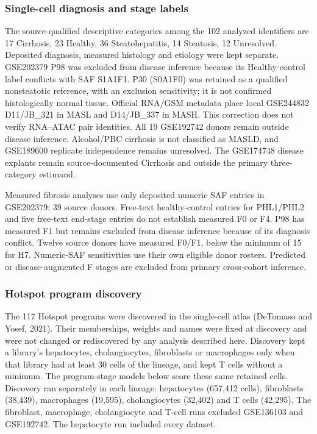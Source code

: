 \subsubsection{Single-cell diagnosis and stage labels}\label{single-cell-diagnosis-and-stage-labels}

The source-qualified descriptive categories among the 102 analyzed identifiers are 17 Cirrhosis, 23 Healthy, 36 Steatohepatitis, 14 Steatosis, 12 Unresolved. Deposited diagnosis, measured histology and etiology were kept separate. GSE202379 P98 was excluded from disease inference because its Healthy-control label conflicts with SAF S1A1F1. P30 (S0A1F0) was retained as a qualified nonsteatotic reference, with an exclusion sensitivity; it is not confirmed histologically normal tissue. Official RNA/GSM metadata place local GSE244832 D11/JB\_\allowbreak{}321 in MASL and D14/JB\_\allowbreak{}337 in MASH. This correction does not verify RNA--ATAC pair identities. All 19 GSE192742 donors remain outside disease inference. Alcohol/PBC cirrhosis is not classified as MASLD, and GSE189600 replicate independence remains unresolved. The GSE174748 disease explants remain source-documented Cirrhosis and outside the primary three-category estimand.

Measured fibrosis analyses use only deposited numeric SAF entries in GSE202379: 39 source donors. Free-text healthy-control entries for PHL1/PHL2 and five free-text end-stage entries do not establish measured F0 or F4. P98 has measured F1 but remains excluded from disease inference because of its diagnosis conflict. Twelve source donors have measured F0/F1, below the minimum of 15 for H7. Numeric-SAF sensitivities use their own eligible donor rosters. Predicted or disease-augmented F stages are excluded from primary cross-cohort inference.

\subsubsection{Hotspot program discovery}\label{hotspot-program-discovery}

The 117 Hotspot programs were discovered in the single-cell atlas (DeTomaso and Yosef, 2021). Their memberships, weights and names were fixed at discovery and were not changed or rediscovered by any analysis described here. Discovery kept a library's hepatocytes, cholangiocytes, fibroblasts or macrophages only when that library had at least 30 cells of the lineage, and kept T cells without a minimum. The program-stage models below score these same retained cells. Discovery ran separately in each lineage: hepatocytes (657,412 cells), fibroblasts (38,439), macrophages (19,595), cholangiocytes (32,402) and T cells (42,295). The fibroblast, macrophage, cholangiocyte and T-cell runs excluded GSE136103 and GSE192742. The hepatocyte run included every dataset.

